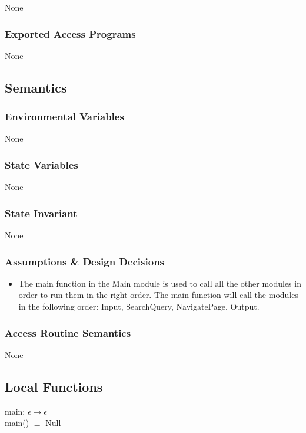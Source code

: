 \documentclass{article}
\begin{document}
None

\subsubsection* {Exported Access Programs}

None

\subsection* {Semantics}

\subsubsection* {Environmental Variables}

None

\subsubsection* {State Variables}

None

\subsubsection* {State Invariant}

None

\subsubsection* {Assumptions \& Design Decisions}

\begin{itemize}
    \item The main function in the Main module is used to call all the other modules in order to run them in the right order. The main function will call the modules in the following order: Input, SearchQuery, NavigatePage, Output.
\end{itemize}

\subsubsection* {Access Routine Semantics}

None

\subsection* {Local Functions}

\noindent main: $\epsilon \rightarrow \epsilon$  \\
main() $\equiv$ Null\\
\end{document}
